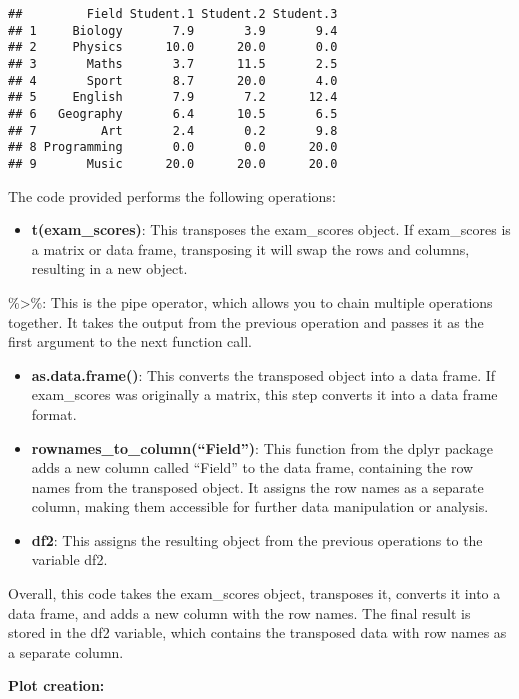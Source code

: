 \documentclass[
]{article}
\providecommand{\tightlist}{%
  \setlength{\itemsep}{0pt}\setlength{\parskip}{0pt}}
\begin{document}
\begin{verbatim}
##         Field Student.1 Student.2 Student.3
## 1     Biology       7.9       3.9       9.4
## 2     Physics      10.0      20.0       0.0
## 3       Maths       3.7      11.5       2.5
## 4       Sport       8.7      20.0       4.0
## 5     English       7.9       7.2      12.4
## 6   Geography       6.4      10.5       6.5
## 7         Art       2.4       0.2       9.8
## 8 Programming       0.0       0.0      20.0
## 9       Music      20.0      20.0      20.0
\end{verbatim}

The code provided performs the following operations:

\begin{itemize}
\tightlist
\item
  \textbf{t(exam\_scores)}: This transposes the exam\_scores object. If
  exam\_scores is a matrix or data frame, transposing it will swap the
  rows and columns, resulting in a new object.
\end{itemize}

\%\textgreater\%: This is the pipe operator, which allows you to chain
multiple operations together. It takes the output from the previous
operation and passes it as the first argument to the next function call.

\begin{itemize}
\item
  \textbf{as.data.frame()}: This converts the transposed object into a
  data frame. If exam\_scores was originally a matrix, this step
  converts it into a data frame format.
\item
  \textbf{rownames\_to\_column(``Field'')}: This function from the dplyr
  package adds a new column called ``Field'' to the data frame,
  containing the row names from the transposed object. It assigns the
  row names as a separate column, making them accessible for further
  data manipulation or analysis.
\item
  \textbf{df2}: This assigns the resulting object from the previous
  operations to the variable df2.
\end{itemize}

Overall, this code takes the exam\_scores object, transposes it,
converts it into a data frame, and adds a new column with the row names.
The final result is stored in the df2 variable, which contains the
transposed data with row names as a separate column.

\textbf{Plot creation:}
\end{document}
